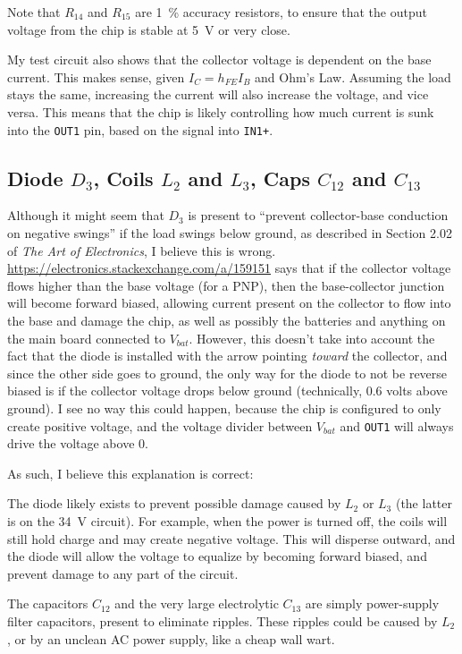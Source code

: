 \documentclass{article}
\newcommand{\Vbat}{$V_{bat}$}
\newcommand{\chippin}{\texttt}
\begin{document}
Note that $R_{14}$ and $R_{15}$ are \qty{1}{\%} accuracy resistors, to
ensure that the output voltage from the chip is stable at
\qty{5}{\volt} or very close.

My test circuit also shows that the collector voltage is dependent on
the base current. This makes sense, given $I_C = h_{FE}I_B$ and Ohm's
Law. Assuming the load stays the same, increasing the current will
also increase the voltage, and vice versa. This means that the chip is
likely controlling how much current is sunk into the \chippin{OUT1}
pin, based on the signal into \chippin{IN1+}.

\subsection{Diode $D_3$, Coils $L_2$ and $L_3$, Caps $C_{12}$ and
  $C_{13}$}
Although it might seem that $D_3$ is present to ``prevent
collector-base conduction on negative swings'' if the load swings
below ground, as described in Section 2.02 of \textit{The Art of
  Electronics}, I believe this is
wrong. \url{https://electronics.stackexchange.com/a/159151} says that
if the collector voltage flows higher than the base voltage (for a
PNP), then the base-collector junction will become forward biased,
allowing current present on the collector to flow into the base and
damage the chip, as well as possibly the batteries and anything on the
main board connected to \Vbat. However, this doesn't take into account
the fact that the diode is installed with the arrow pointing
\emph{toward} the collector, and since the other side goes to ground,
the only way for the diode to not be reverse biased is if the
collector voltage drops below ground (technically, 0.6 volts above
ground). I see no way this could happen, because the chip is
configured to only create positive voltage, and the voltage divider
between \Vbat{} and \chippin{OUT1} will always drive the voltage above
0.

As such, I believe this explanation is correct:

The diode likely exists to prevent possible damage caused by $L_2$ or
$L_3$ (the latter is on the \qty{34}{\volt} circuit). For example,
when the power is turned off, the coils will still hold charge and may
create negative voltage. This will disperse outward, and the diode
will allow the voltage to equalize by becoming forward biased, and
prevent damage to any part of the circuit.

The capacitors $C_{12}$ and the very large electrolytic $C_{13}$ are
simply power-supply filter capacitors, present to eliminate
ripples. These ripples could be caused by $L_2$, or by an unclean
AC power supply, like a cheap wall wart.
\end{document}
